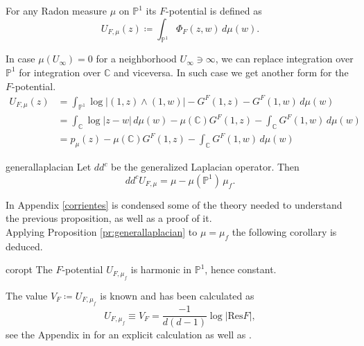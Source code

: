 \begin{mydef}{}{}
For any Radon measure $\mu$ on $\mathbb{P}^1$ its $F$-potential is defined as
$$U_{F,\mu}(z) \coloneqq \int_{\mathbb{P}^1} \Phi_F(z,w)\,d\mu(w).$$
\end{mydef}
In case $\mu(U_\infty)=0$ for a neighborhood $U_\infty\ni \infty$, we can replace integration over $\mathbb{P}^1$ for integration over $\mathbb{C}$ and viceversa. In such case we get another form for the $F$-potential.\\
\begin{align}\label{potential_equation}
U_{F,\mu}(z) &= \int_{\mathbb{P}^1} \log|(1,z)\wedge (1,w)| - G^F(1,z) - G^F(1,w) \,d\mu(w) \nonumber\\
&=\int_{\mathbb{C}} \log|z-w|\,d\mu(w) - \mu(\mathbb{C})G^F(1,z) - \int_{\mathbb{C}} G^F(1,w)\,d\mu(w) \nonumber\\
&=p_{\mu}(z) - \mu(\mathbb{C})G^F(1,z) - \int_{\mathbb{C}} G^F(1,w)\,d\mu(w)
\end{align}

\begin{myprop}{}{generallaplacian}
Let $dd^c$ be the generalized Laplacian operator. Then
$$dd^c U_{F,\mu} = \mu -\mu(\mathbb{P}^1)\,\mu_f.$$
\end{myprop}

In Appendix \ref{corrientes} is condensed some of the theory needed to understand the previous proposition, as well as a proof of it.\\

Applying Proposition \ref{pr:generallaplacian} to $\mu=\mu_f$ the following corollary is deduced.\\

\begin{mycoro}{}{coropt}
The $F$-potential $U_{F,\mu_f}$ is harmonic in $\mathbb{P}^1$, hence constant.
\end{mycoro}

The value $V_F \coloneqq U_{F,\mu_f}$ is known and has been calculated as 
\begin{equation}\label{Vdemarco}
U_{F,\mu_f} \equiv V_F = \frac{-1}{d(d-1)}\log |\text{Res} F|,
\end{equation}
 see the Appendix in \cite{okuyama} for an explicit calculation as well as \cite[Theorem 1.5]{demarco}.\\
